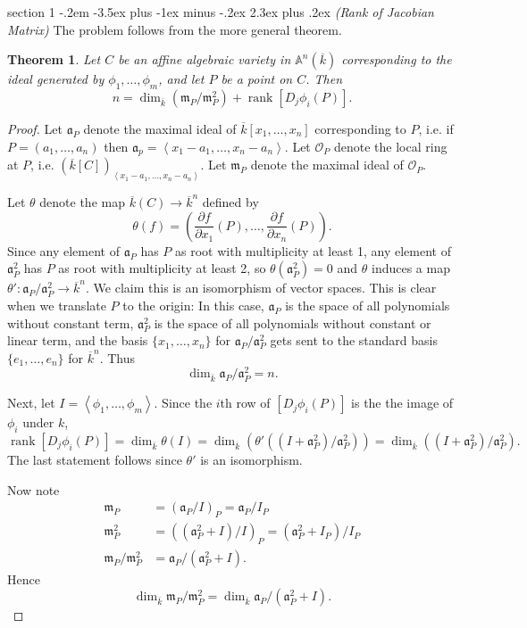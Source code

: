 \documentclass[12pt]{article}
\makeatletter
\theoremstyle{norm}
\newtheorem{thm}{Theorem}[section]
\newcommand{\A}[0]{\mathbb{A}}
\newcommand{\sO}[0]{\mathcal{O}}
\newcommand{\ma}[0]{\mathfrak{a}}
\newcommand{\mm}[0]{\mathfrak{m}}
\newcommand{\te}[0]{\theta}
\newcommand{\pa}[1]{\left( {#1} \right)}
\newcommand{\an}[1]{\left\langle {#1}\right\rangle}
\newcommand{\rank}{\operatorname{rank}}
\newcommand{\pd}[2]{\frac{\partial #1}{\partial #2}}
\newcommand{\ol}[1]{\overline{#1}}
\newenvironment{problem}{\@startsection
       {section}
       {1}
       {-.2em}
       {-3.5ex plus -1ex minus -.2ex}
       {2.3ex plus .2ex}
       {\pagebreak[3]%
       \large\bf\noindent{Problem }
       }
       }
       {%
       }
\makeatother
\begin{document}
\begin{problem}{\it (Rank of Jacobian Matrix)}
The problem follows from the more general theorem.
\begin{thm}
Let $C$ be an affine algebraic variety in $\A^n(\ol{k})$ corresponding to the ideal generated by $\phi_1,\ldots, \phi_m$, and let $P$ be a point on $C$. Then
\[
n=\dim_{\ol k}(\mm_P/\mm_P^2)+\rank[D_j\phi_i(P)].
\]
\end{thm}
\begin{proof}
Let $\ma_P$ denote the maximal ideal of $\ol{k}[x_1,\ldots, x_n]$ corresponding to $P$, i.e. if $P=(a_1,\ldots, a_n)$ then $\ma_p=\an{x_1-a_1,\ldots, x_n-a_n}$. Let $\sO_P$ denote the local ring at $P$, i.e. $(\ol{k}[C])_{\an{x_1-a_1,\ldots, x_n-a_n}}$. Let $\mm_P$ denote the maximal ideal of $\sO_P$.

Let $\theta$ denote the map $\ol{k}(C)\to \ol{k}^n$ defined by
\[
\theta(f)=\pa{
\pd{f}{x_1}(P),\ldots, \pd{f}{x_n}(P)
}.
\]
Since any element of $\ma_P$ has $P$ as root with multiplicity at least 1, any element of $\ma_P^2$ has $P$ as root with multiplicity at least 2, so $\te(\ma_P^2)=0$ and $\te$ induces a map $\te':%
\ma_P/\ma_P^2\to \ol{k}^n$. We claim this is an isomorphism of vector spaces. %
This is clear when we translate $P$ to the origin: In this case, $\ma_P$ is the space of all polynomials without constant term, $\ma_P^2$ is the space of all polynomials without constant or linear term, and the basis $\{x_1,\ldots, x_n\}$ for $\ma_P/\ma_P^2$ gets sent to the standard basis $\{e_1,\ldots, e_n\}$ for $\ol{k}^n$. Thus
\begin{equation}\label{p6-3-1}
\dim_{\ol k} \ma_P/\ma_P^2=n.
\end{equation}

Next, let $I=\an{\phi_1,\ldots, \phi_m}$. Since the $i$th row of $[D_j\phi_i(P)]$ is the the image of $\phi_i$ under $k$,
\begin{equation}\label{p6-3-2}
\rank [D_j\phi_i(P)]=\dim_{\ol k} \te(I)=\dim_{\ol k} (\te'((I+\ma_P^2)/\ma_P^2))=\dim_{\ol k}((I+\ma_P^2)/\ma_P^2).
\end{equation}
The last statement follows since $\te'$ is an isomorphism.

Now note
\begin{align*}
\mm_P&=(\ma_P/I)_P=\ma_P/I_P\\
\mm_P^2&=((\ma_P^2+I)/I)_P=(\ma_P^2+I_P)/I_P\\
\mm_P/\mm_P^2&=\ma_P/(\ma_P^2+I).
\end{align*}
Hence
\begin{equation}\label{p6-3-3}
\dim_{\ol k} \mm_P/\mm_P^2=\dim_{\ol k} \ma_P/(\ma_P^2+I).
\end{equation}


\end{proof}
\end{problem}
\end{document}
